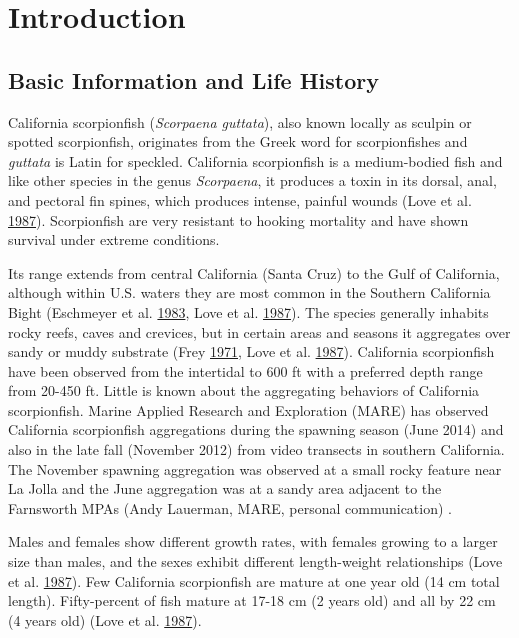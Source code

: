 \documentclass[12pt,]{article}
\begin{document}

\section{Introduction}\label{introduction}

\subsection{Basic Information and Life
History}\label{basic-information-and-life-history}

California scorpionfish (\emph{Scorpaena guttata}), also known locally
as sculpin or spotted scorpionfish, originates from the Greek word for
scorpionfishes and \emph{guttata} is Latin for speckled. California
scorpionfish is a medium-bodied fish and like other species in the genus
\emph{Scorpaena}, it produces a toxin in its dorsal, anal, and pectoral
fin spines, which produces intense, painful wounds (Love et al.
\protect\hyperlink{ref-Love1987}{1987}). Scorpionfish are very resistant
to hooking mortality and have shown survival under extreme conditions.

Its range extends from central California (Santa Cruz) to the Gulf of
California, although within U.S. waters they are most common in the
Southern California Bight (Eschmeyer et al.
\protect\hyperlink{ref-Eschmeyer1983}{1983}, Love et al.
\protect\hyperlink{ref-Love1987}{1987}). The species generally inhabits
rocky reefs, caves and crevices, but in certain areas and seasons it
aggregates over sandy or muddy substrate (Frey
\protect\hyperlink{ref-Frey1971}{1971}, Love et al.
\protect\hyperlink{ref-Love1987}{1987}). California scorpionfish have
been observed from the intertidal to 600 ft with a preferred depth range
from 20-450 ft. Little is known about the aggregating behaviors of
California scorpionfish. Marine Applied Research and Exploration (MARE)
has observed California scorpionfish aggregations during the spawning
season (June 2014) and also in the late fall (November 2012) from video
transects in southern California. The November spawning aggregation was
observed at a small rocky feature near La Jolla and the June aggregation
was at a sandy area adjacent to the Farnsworth MPAs (Andy Lauerman,
MARE, personal communication) .

Males and females show different growth rates, with females growing to a
larger size than males, and the sexes exhibit different length-weight
relationships (Love et al. \protect\hyperlink{ref-Love1987}{1987}). Few
California scorpionfish are mature at one year old (14 cm total length).
Fifty-percent of fish mature at 17-18 cm (2 years old) and all by 22 cm
(4 years old) (Love et al. \protect\hyperlink{ref-Love1987}{1987}).
\end{document}
